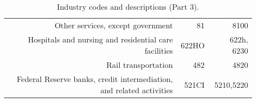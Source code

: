 \begin{landscape}
\begin{table}[h]
\begin{center}
\begin{tabular}{rrr}
Other services, except government                                    & 81          & 8100      \\%
Hospitals and nursing and residential care facilities                & 622HO       & 622h, 6230\\%
Rail transportation                                                  & 482         & 4820      \\%
Federal Reserve banks, credit intermediation, and related activities & 521CI       & 5210,5220 \\%
\hline\hline
\end{tabular}
\end{center}
\caption{\label{tab:industries_3}Industry codes and descriptions (Part 3).}
\end{table}


\end{landscape}